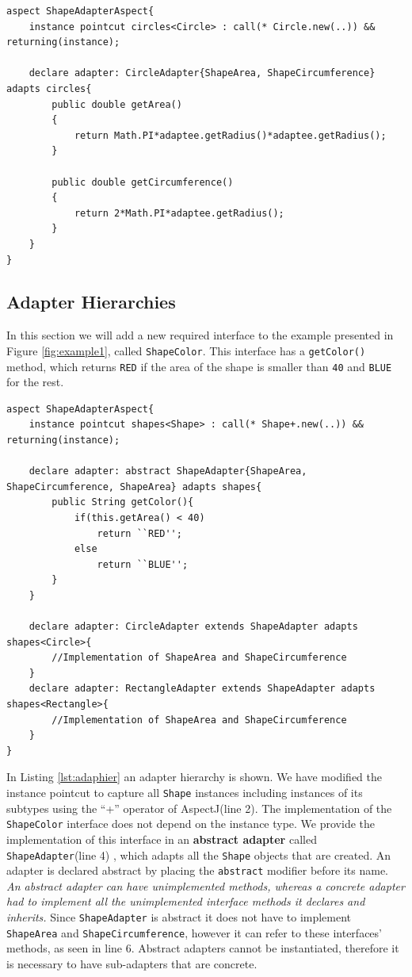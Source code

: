 \documentclass{llncs}
\begin{document}
\begin{lstlisting}[float=tb, caption={An instance pointcut selecting Circle objects and an adapter declaration using this pointcut}, label={lst:circle}]
aspect ShapeAdapterAspect{
	instance pointcut circles<Circle> : call(* Circle.new(..)) && returning(instance);

	declare adapter: CircleAdapter{ShapeArea, ShapeCircumference} adapts circles{
		public double getArea()
		{
			return Math.PI*adaptee.getRadius()*adaptee.getRadius();
		}
				
		public double getCircumference()
		{
			return 2*Math.PI*adaptee.getRadius();
		}
	}
}
\end{lstlisting}

\subsection{Adapter Hierarchies}
In this section we will add a new required interface to the example presented in Figure \ref{fig:example1}, called \texttt{ShapeColor}. This interface has a \texttt{getColor()} method, which returns \texttt{RED} if the area of the shape is smaller than \texttt{40} and \texttt{BLUE} for the rest. 

\begin{lstlisting}[float=tb, caption={An Adapter Hierarchy}, label={lst:adaphier}]
aspect ShapeAdapterAspect{
	instance pointcut shapes<Shape> : call(* Shape+.new(..)) && returning(instance);
	
	declare adapter: abstract ShapeAdapter{ShapeArea, ShapeCircumference, ShapeArea} adapts shapes{
		public String getColor(){
			if(this.getArea() < 40)
				return ``RED'';
			else
				return ``BLUE'';
		}
	}

	declare adapter: CircleAdapter extends ShapeAdapter adapts shapes<Circle>{
		//Implementation of ShapeArea and ShapeCircumference
	}
	declare adapter: RectangleAdapter extends ShapeAdapter adapts shapes<Rectangle>{
		//Implementation of ShapeArea and ShapeCircumference
	}
}
\end{lstlisting}

In Listing \ref{lst:adaphier} an adapter hierarchy is shown. We have modified the instance pointcut to capture all \texttt{Shape} instances including instances of its subtypes using the ``+'' operator of AspectJ(line 2). The implementation of the \texttt{ShapeColor} interface does not depend on the instance type. We provide the implementation of this interface in an \textbf{abstract adapter} called \texttt{ShapeAdapter}(line 4) , which adapts all the \texttt{Shape} objects that are created. An adapter is declared abstract by placing the \texttt{abstract} modifier before its name. \emph{An abstract adapter can have unimplemented methods, whereas a concrete adapter had to implement all the unimplemented interface methods it declares and inherits.} Since \texttt{ShapeAdapter} is abstract it does not have to implement \texttt{ShapeArea} and \texttt{ShapeCircumference}, however it can refer to these interfaces' methods, as seen in line 6.  Abstract adapters cannot be instantiated, therefore it is necessary to have sub-adapters that are concrete.
\end{document}
